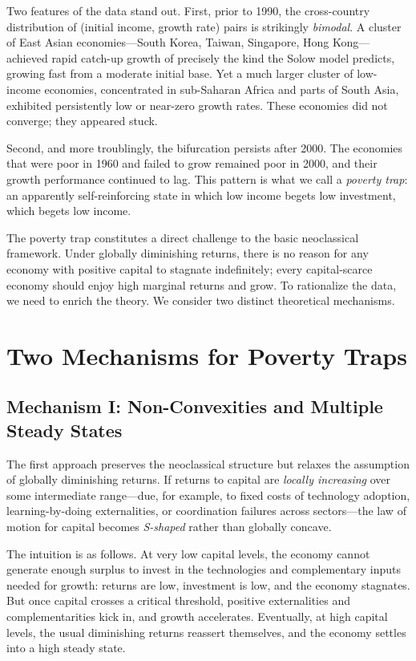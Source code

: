 Two features of the data stand out. First, prior to 1990, the cross-country distribution of (initial income, growth rate) pairs is strikingly \textit{bimodal}. A cluster of East Asian economies---South Korea, Taiwan, Singapore, Hong Kong---achieved rapid catch-up growth of precisely the kind the Solow model predicts, growing fast from a moderate initial base. Yet a much larger cluster of low-income economies, concentrated in sub-Saharan Africa and parts of South Asia, exhibited persistently low or near-zero growth rates. These economies did not converge; they appeared stuck.

Second, and more troublingly, the bifurcation persists after 2000. The economies that were poor in 1960 and failed to grow remained poor in 2000, and their growth performance continued to lag. This pattern is what we call a \textit{poverty trap}: an apparently self-reinforcing state in which low income begets low investment, which begets low income.

The poverty trap constitutes a direct challenge to the basic neoclassical framework. Under globally diminishing returns, there is no reason for any economy with positive capital to stagnate indefinitely; every capital-scarce economy should enjoy high marginal returns and grow. To rationalize the data, we need to enrich the theory. We consider two distinct theoretical mechanisms.

\section{Two Mechanisms for Poverty Traps}

\subsection{Mechanism I: Non-Convexities and Multiple Steady States}

The first approach preserves the neoclassical structure but relaxes the assumption of globally diminishing returns. If returns to capital are \textit{locally increasing} over some intermediate range---due, for example, to fixed costs of technology adoption, learning-by-doing externalities, or coordination failures across sectors---the law of motion for capital becomes \textit{S-shaped} rather than globally concave.

The intuition is as follows. At very low capital levels, the economy cannot generate enough surplus to invest in the technologies and complementary inputs needed for growth: returns are low, investment is low, and the economy stagnates. But once capital crosses a critical threshold, positive externalities and complementarities kick in, and growth accelerates. Eventually, at high capital levels, the usual diminishing returns reassert themselves, and the economy settles into a high steady state.

